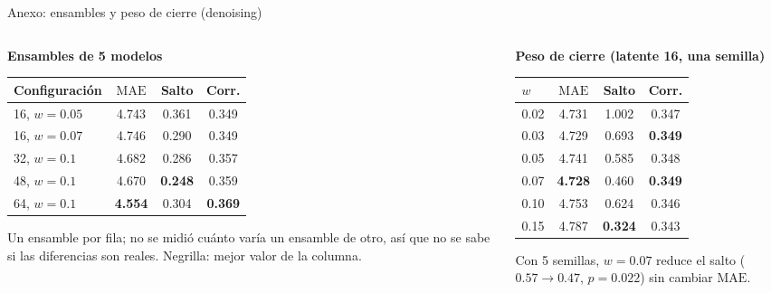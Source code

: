 \documentclass[aspectratio=169,10pt,t]{beamer}
\newcommand{\mae}{\ensuremath{\mathrm{MAE}}}
\begin{document}
\begin{frame}{Anexo: ensambles y peso de cierre (denoising)}
\begin{columns}[T]
\begin{column}{0.5\textwidth}
\centering\small\textbf{Ensambles de 5 modelos}

\begin{tabular}{lccc}
\toprule
Configuración & \mae{} & Salto & Corr.\\
\midrule
16, $w=0.05$ & 4.743 & 0.361 & 0.349\\
16, $w=0.07$ & 4.746 & 0.290 & 0.349\\
32, $w=0.1$ & 4.682 & 0.286 & 0.357\\
48, $w=0.1$ & 4.670 & \textbf{0.248} & 0.359\\
64, $w=0.1$ & \textbf{4.554} & 0.304 & \textbf{0.369}\\
\bottomrule
\end{tabular}

{\scriptsize Un ensamble por fila; no se midió cuánto varía un ensamble de otro, así que no se sabe si las diferencias son reales. Negrilla: mejor valor de la columna.}
\end{column}
\begin{column}{0.48\textwidth}
\centering\small\textbf{Peso de cierre (latente 16, una semilla)}

\begin{tabular}{lccc}
\toprule
$w$ & \mae{} & Salto & Corr.\\
\midrule
0.02 & 4.731 & 1.002 & 0.347\\
0.03 & 4.729 & 0.693 & \textbf{0.349}\\
0.05 & 4.741 & 0.585 & 0.348\\
0.07 & \textbf{4.728} & 0.460 & \textbf{0.349}\\
0.10 & 4.753 & 0.624 & 0.346\\
0.15 & 4.787 & \textbf{0.324} & 0.343\\
\bottomrule
\end{tabular}

{\scriptsize Con 5 semillas, $w=0.07$ reduce el salto ($0.57\to0.47$, $p=0.022$) sin cambiar \mae{}.}
\end{column}
\end{columns}
\end{frame}
\end{document}
